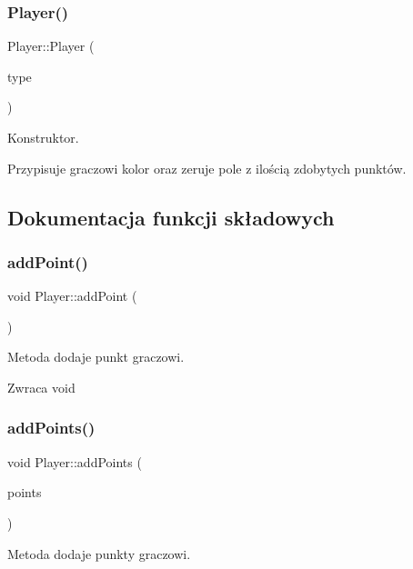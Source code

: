 \subsubsection{Player()}
{\footnotesize\ttfamily Player\+::\+Player (\begin{DoxyParamCaption}\item[{Field\+Color}]{type }\end{DoxyParamCaption})\hspace{0.3cm}{\ttfamily [inline]}}



Konstruktor. 

Przypisuje graczowi kolor oraz zeruje pole z ilością zdobytych punktów. 

\subsection{Dokumentacja funkcji składowych}
\mbox{\label{class_player_abbfd48cf5f5d3c786eab73b0843f5075}} 
\subsubsection{addPoint()}
{\footnotesize\ttfamily void Player\+::add\+Point (\begin{DoxyParamCaption}{ }\end{DoxyParamCaption})\hspace{0.3cm}{\ttfamily [inline]}}



Metoda dodaje punkt graczowi. 

\begin{DoxyReturn}{Zwraca}
void 
\end{DoxyReturn}
\mbox{\label{class_player_a6bf27b492e8ed5d4f13ede5e435dbd9c}} 
\subsubsection{addPoints()}
{\footnotesize\ttfamily void Player\+::add\+Points (\begin{DoxyParamCaption}\item[{unsigned}]{points }\end{DoxyParamCaption})\hspace{0.3cm}{\ttfamily [inline]}}



Metoda dodaje punkty graczowi. 


